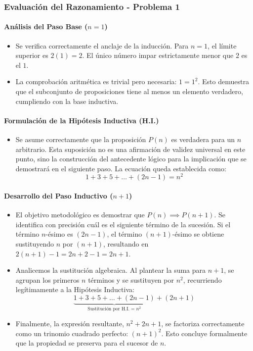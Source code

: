 \documentclass{article}
\begin{document}
\subsubsection{Evaluación del Razonamiento - Problema 1}
\label{sec:evaluacion-1}

\paragraph{Análisis del Paso Base ($n=1$)}
\begin{itemize}
    \item Se verifica correctamente el anclaje de la inducción. Para $n=1$, el límite superior es $2(1) = 2$. El único número impar estrictamente menor que $2$ es el $1$.
    \item La comprobación aritmética es trivial pero necesaria: $1 = 1^2$. Esto demuestra que el subconjunto de proposiciones tiene al menos un elemento verdadero, cumpliendo con la base inductiva.
\end{itemize}

\paragraph{Formulación de la Hipótesis Inductiva (H.I.)}
\begin{itemize}
    \item Se asume correctamente que la proposición $P(n)$ es verdadera para un $n$ arbitrario. Esta suposición no es una afirmación de validez universal en este punto, sino la construcción del antecedente lógico para la implicación que se demostrará en el siguiente paso. La ecuación queda establecida como:
    \[
    1 + 3 + 5 + \dots + (2n - 1) = n^2
    \]
\end{itemize}

\paragraph{Desarrollo del Paso Inductivo ($n+1$)}
\begin{itemize}
    \item El objetivo metodológico es demostrar que $P(n) \implies P(n+1)$. Se identifica con precisión cuál es el siguiente término de la sucesión. Si el término $n$-ésimo es $(2n - 1)$, el término $(n+1)$-ésimo se obtiene sustituyendo $n$ por $(n+1)$, resultando en $2(n+1) - 1 = 2n + 2 - 1 = 2n + 1$.
    \item Analicemos la sustitución algebraica. Al plantear la suma para $n+1$, se agrupan los primeros $n$ términos y se sustituyen por $n^2$, recurriendo legítimamente a la Hipótesis Inductiva:
    \[
    \underbrace{1 + 3 + 5 + \dots + (2n - 1)}_{\text{Sustitución por H.I.} = n^2} + (2n + 1)
    \]
    \item Finalmente, la expresión resultante, $n^2 + 2n + 1$, se factoriza correctamente como un trinomio cuadrado perfecto: $(n + 1)^2$. Esto concluye formalmente que la propiedad se preserva para el sucesor de $n$.
\end{itemize}
\end{document}
